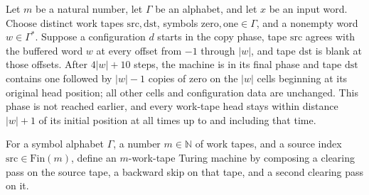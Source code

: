 \begin{theorem}
\label{Turing.rt_position_run}
\leanok
{}
Let $m$ be a natural number, let $\Gamma$ be an alphabet, and let $x$ be an input word.
Choose distinct work tapes $\mathrm{src},\mathrm{dst}$, symbols
$\mathrm{zero},\mathrm{one}\in\Gamma$, and a nonempty word $w\in\Gamma^*$. Suppose a
configuration $d$ starts in the copy phase, tape $\mathrm{src}$ agrees with the buffered
word $w$ at every offset from $-1$ through $|w|$, and tape $\mathrm{dst}$ is blank at
those offsets. After $4|w|+10$ steps, the machine is in its final phase and tape
$\mathrm{dst}$ contains $\mathrm{one}$ followed by $|w|-1$ copies of $\mathrm{zero}$ on
the $|w|$ cells beginning at its original head position; all other cells and
configuration data are unchanged. This phase is not reached earlier, and every work-tape
head stays within distance $|w|+1$ of its initial position at all times up to and
including that time.
\end{theorem}

\begin{definition}
\label{Turing.rt_cleanTemplateTM}
\leanok
{}
For a symbol alphabet $\Gamma$, a number $m\in\mathbb N$ of work tapes, and a source
index $\mathrm{src}\in\mathrm{Fin}(m)$, define an $m$-work-tape Turing machine by
composing a clearing pass on the source tape, a backward skip on that tape, and a second
clearing pass on it.
\end{definition}

